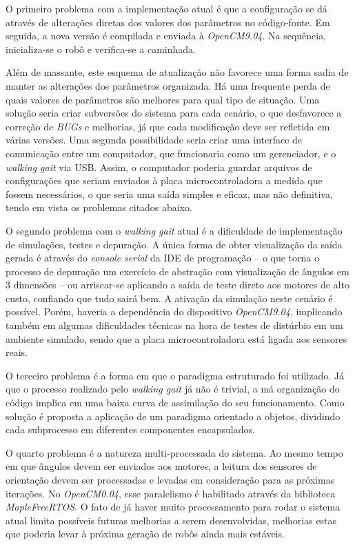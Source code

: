 O primeiro problema com a implementação atual é que a configuração se dá através de alterações diretas dos valores dos parâmetros no código-fonte. Em seguida, a nova versão é compilada e enviada à \textit{OpenCM9.04}. Na sequência, inicializa-se o robô e verifica-se a caminhada.

Além de massante, este esquema de atualização não favorece uma forma sadia de manter as alterações dos parâmetros organizada. Há uma frequente perda de quais valores de parâmetros são melhores para qual tipo de situação. Uma solução seria criar subversões do sistema para cada cenário, o que desfavorece a correção de \textit{BUGs} e melhorias, já que cada modificação deve ser refletida em várias versões. Uma segunda possibilidade seria criar uma interface de comunicação entre um computador, que funcionaria como um gerenciador, e o \textit{walking gait} via USB. Assim, o computador poderia guardar arquivos de configurações que seriam enviados à placa microcontroladora a medida que fossem necessários, o que seria uma saída simples e eficaz, mas não definitiva, tendo em vista os problemas citados abaixo.

O segundo problema com o \textit{walking gait} atual é a dificuldade de implementação de simulações, testes e depuração. A única forma de obter visualização da saída gerada é através do \textit{console serial} da IDE de programação -- o que torna o processo de depuração um exercício de abstração com visualização de ângulos em 3 dimensões -- ou arriscar-se aplicando a saída de teste direto aos motores de alto custo, confiando que tudo sairá bem. A ativação da simulação neste cenário é possível. Porém, haveria a dependência do dispositivo \textit{OpenCM9.04}, implicando também em algumas dificuldades técnicas na hora de testes de distúrbio em um ambiente simulado, sendo que a placa microcontroladora está ligada aos sensores reais.

O terceiro problema é a forma em que o paradigma estruturado foi utilizado. Já que o processo realizado pelo \textit{walking gait} já não é trivial, a má organização do código implica em uma baixa curva de assimilação do seu funcionamento. Como solução é proposta a aplicação de um paradigma orientado a objetos, dividindo cada subprocesso em diferentes componentes encapsulados.

O quarto problema é a natureza multi-processada do sistema. Ao mesmo tempo em que ângulos devem ser enviados aos motores, a leitura dos sensores de orientação devem ser processadas e levadas em consideração para as próximas iterações. No \textit{OpenCM0.04}, esse paralelismo é habilitado através da biblioteca \textit{MapleFreeRTOS}. O fato de já haver muito processamento para rodar o sistema atual limita possíveis futuras melhorias a serem desenvolvidas, melhorias estas que poderia levar à próxima geração de robôs ainda mais estáveis.


